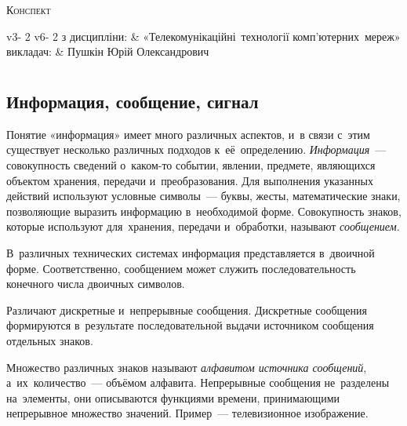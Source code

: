 \documentclass[
	a4paper,
	oneside,
	BCOR = 10mm,
	DIV = 12,
	12pt,
	headings = normal,
]{scrartcl}
\newlength{\gridunitwidth}
\newlength{\gridunitheight}
\begin{document}
\begin{titlepage}
		\vspace*{4\gridunitheight}
			\noindent\textsc{Конспект}\\[\baselineskip]
			{\setlength{\tabcolsep}{0em}
			\begin{tabular}{
					v{3\gridunitwidth - 2\tabcolsep}
					v{6\gridunitwidth - 2\tabcolsep}
			}
				з дисципліни: & «Телекомунікаційні~технології комп'ютерних~мереж»\\
				викладач:     & Пушкін Юрій Олександрович\\
			\end{tabular}
			}
		\vspace*{\fill}
	\end{titlepage}

	\tableofcontents
	\newpage

	\section{}
		\subsection{Информация, сообщение, сигнал}
			Понятие «информация» имеет много различных аспектов, и~в связи с~этим существует несколько различных подходов к~её~определению. \emph{Информация}~— совокупность сведений о~каком-то событии, явлении, предмете, являющихся объектом хранения, передачи и~преобразования. Для выполнения указанных действий используют условные символы~— буквы, жесты, математические знаки, позволяющие выразить информацию в~необходимой форме. Совокупность знаков, которые используют для~хранения, передачи и~обработки, называют \emph{сообщением}. 
			
			В~различных технических системах информация представляется в~двоичной форме. Соответственно, сообщением может служить последовательность конечного числа двоичных символов.

			Различают дискретные и~непрерывные сообщения. Дискретные сообщения формируются в~результате последовательной выдачи источником сообщения отдельных знаков.

			Множество различных знаков называют \emph{алфавитом источника сообщений}, а~их~количество~— объёмом алфавита. Непрерывные сообщения не~разделены на~элементы, они описываются функциями времени, принимающими непрерывное множество значений. Пример~— телевизионное изображение.
\end{document}
